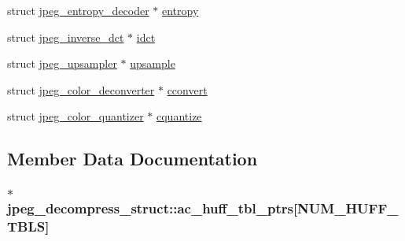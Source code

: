 \begin{DoxyCompactItemize}
\item 
struct \hyperlink{structjpeg__entropy__decoder}{jpeg\+\_\+entropy\+\_\+decoder} $\ast$ \hyperlink{structjpeg__decompress__struct_ac53f055b3d8103caa6c7ba4b4975eb5b}{entropy}
\item 
struct \hyperlink{structjpeg__inverse__dct}{jpeg\+\_\+inverse\+\_\+dct} $\ast$ \hyperlink{structjpeg__decompress__struct_a2ef67a2829f8ecebb1af0ed440bff8bf}{idct}
\item 
struct \hyperlink{structjpeg__upsampler}{jpeg\+\_\+upsampler} $\ast$ \hyperlink{structjpeg__decompress__struct_a80ad7e1c14488a065697b09679479c5d}{upsample}
\item 
struct \hyperlink{structjpeg__color__deconverter}{jpeg\+\_\+color\+\_\+deconverter} $\ast$ \hyperlink{structjpeg__decompress__struct_a1f88347e58f8f9d93954aa885f3497fb}{cconvert}
\item 
struct \hyperlink{structjpeg__color__quantizer}{jpeg\+\_\+color\+\_\+quantizer} $\ast$ \hyperlink{structjpeg__decompress__struct_ace3f4f51b8cf7bd24428ae9d10f5ddf1}{cquantize}
\end{DoxyCompactItemize}


\subsection{Member Data Documentation}
\hypertarget{structjpeg__decompress__struct_a8d6e49569f3edc0ad43ffa5d6a95bb48}{}
\subsubsection[{ac\+\_\+huff\+\_\+tbl\+\_\+ptrs}]{$\ast$ jpeg\+\_\+decompress\+\_\+struct\+::ac\+\_\+huff\+\_\+tbl\+\_\+ptrs\mbox{[}{\bf N\+U\+M\+\_\+\+H\+U\+F\+F\+\_\+\+T\+B\+L\+S}\mbox{]}}\label{structjpeg__decompress__struct_a8d6e49569f3edc0ad43ffa5d6a95bb48}
\hypertarget{structjpeg__decompress__struct_a7949dd3e32058bca5a81fce5caf0b75c}{}
